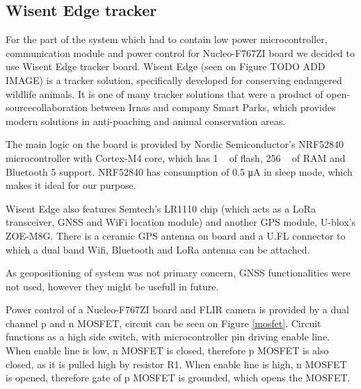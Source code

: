 \subsection{ Wisent Edge tracker}

For the part of the system which had to contain low power microcontroller, communication module and power control for Nucleo-F767ZI board we decided to use Wisent Edge tracker board.
Wisent Edge (seen on Figure TODO ADD IMAGE) is a tracker solution, specifically developed for conserving endangered wildlife animals.
It is one of many tracker solutions that were a product of open-source\footnotemark collaboration between Irnas and company Smart Parks, which provides modern solutions in anti-poaching and animal conservation areas.


The main logic on the board is provided by Nordic Semiconductor's NRF52840 microcontroller with Cortex-M4 core, which has 1 \si{\mega\byte} of flash, 256 \si{\kilo\byte} of RAM and Bluetooth 5 support.
NRF52840 has consumption of 0.5 \si{\micro\ampere} in sleep mode, which makes it ideal for our purpose.

Wisent Edge also features Semtech's LR1110 chip (which acts as a LoRa transceiver, GNSS and WiFi location module) and another GPS module, U-blox's ZOE-M8G\footnotemark.
There is a ceramic GPS antenna on board and a U.FL connector to which a dual band Wifi, Bluetooth and LoRa antenna can be attached.


As geopositioning of system was not primary concern, GNSS functionalities were not used, however they might be usefull in future.

Power control of a Nucleo-F767ZI board and FLIR camera is provided by a dual channel p and n MOSFET, circuit can be seen on Figure \ref{mosfet}.
Circuit functions as a high side switch, with microcontroller pin driving enable line.
When enable line is low, n MOSFET is closed, therefore p MOSFET is also closed, as it is pulled high by resistor R1.
When enable line is high, n MOSFET is opened, therefore gate of p MOSFET is grounded, which opens the MOSFET.

